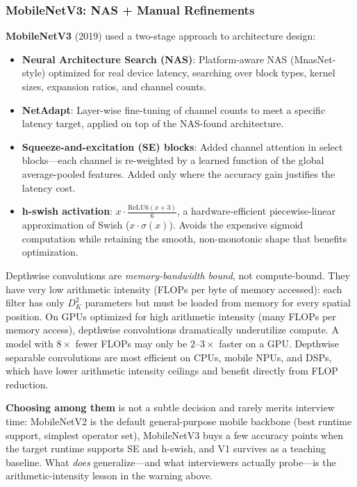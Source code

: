 \subsubsection*{MobileNetV3: NAS + Manual Refinements}

\textbf{MobileNetV3} (2019) used a two-stage approach to architecture design:
\begin{itemize}
    \item \textbf{Neural Architecture Search (NAS)}: Platform-aware NAS (MnasNet-style) optimized for real device latency, searching over block types, kernel sizes, expansion ratios, and channel counts.
    \item \textbf{NetAdapt}: Layer-wise fine-tuning of channel counts to meet a specific latency target, applied on top of the NAS-found architecture.
    \item \textbf{Squeeze-and-excitation (SE) blocks}: Added channel attention in select blocks---each channel is re-weighted by a learned function of the global average-pooled features. Added only where the accuracy gain justifies the latency cost.
    \item \textbf{h-swish activation}: $x \cdot \frac{\text{ReLU6}(x+3)}{6}$, a hardware-efficient piecewise-linear approximation of Swish ($x \cdot \sigma(x)$). Avoids the expensive sigmoid computation while retaining the smooth, non-monotonic shape that benefits optimization.
\end{itemize}

\begin{warningbox}
Depthwise convolutions are \textit{memory-bandwidth bound}, not compute-bound. They have very low arithmetic intensity (FLOPs per byte of memory accessed): each filter has only $D_K^2$ parameters but must be loaded from memory for every spatial position. On GPUs optimized for high arithmetic intensity (many FLOPs per memory access), depthwise convolutions dramatically underutilize compute. A model with $8 \times$ fewer FLOPs may only be $2$--$3 \times$ faster on a GPU. Depthwise separable convolutions are most efficient on CPUs, mobile NPUs, and DSPs, which have lower arithmetic intensity ceilings and benefit directly from FLOP reduction.
\end{warningbox}

\textbf{Choosing among them} is not a subtle decision and rarely merits interview time: MobileNetV2 is the default general-purpose mobile backbone (best runtime support, simplest operator set), MobileNetV3 buys a few accuracy points when the target runtime supports SE and h-swish, and V1 survives as a teaching baseline. What \textit{does} generalize---and what interviewers actually probe---is the arithmetic-intensity lesson in the warning above.


